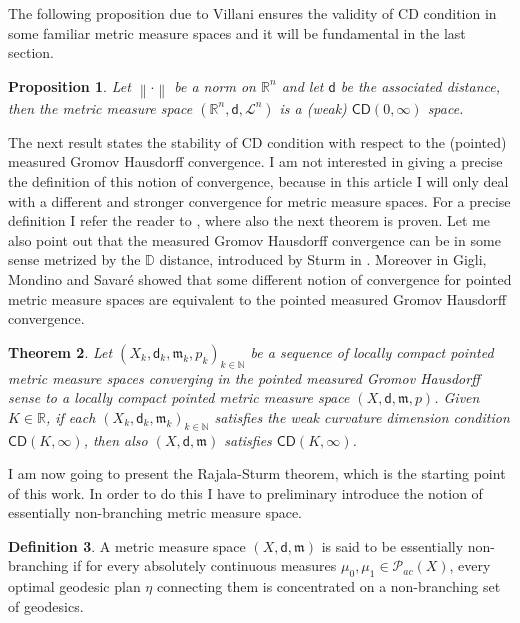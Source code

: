 \documentclass[11pt,twoside,a4paper]{article}
\newcommand{\norm}[1]{\left\lVert#1\right\rVert}
\newcommand{\Leb}{\mathscr{L}}
\newcommand{\setN}{\mathbb{N}}
\newcommand{\R}{\mathbb{R}}
\newcommand{\CD}{\mathsf{CD}}
\newcommand{\di}{\mathsf d} %
\newcommand{\m}{\mathfrak m} %
\newcommand{\Prob}{\mathscr{P}}
\theoremstyle{theorem}
\newtheorem{theorem}{Theorem}[section]
\newtheorem{prop}[theorem]{Proposition}
\theoremstyle{definition}
\newtheorem{definition}[theorem]{Definition}
\theoremstyle{remark}
\theoremstyle{proof}
\begin{document}
\noindent The following proposition due to Villani \cite{villani2008} ensures the validity of CD condition in some familiar metric measure spaces and it will be fundamental in the last section.

\begin{prop}\label{prop:CDinR^n}
Let $\norm{\cdot}$ be a norm on $\R^n$ and let $\di$ be the associated distance, then the metric measure space $(\R^n, \di, \Leb^n)$ is a (weak) $\CD(0,\infty)$ space.
\end{prop}

The next result states the stability of CD condition with respect to the (pointed) measured Gromov Hausdorff convergence. I am not interested in giving a precise the definition of this notion of convergence, because in this article I will only deal with a different and stronger convergence for metric measure spaces. For a precise definition I refer the reader to \cite{villani2008}, where also the next theorem is proven. Let me also point out that the measured Gromov Hausdorff convergence can be in some sense metrized by the $\mathbb{D}$ distance, introduced by Sturm in \cite{sturm2006ii}. Moreover in \cite{Gigli_2015} Gigli, Mondino and Savaré showed that some different notion of convergence for pointed metric measure spaces are equivalent to the pointed measured Gromov Hausdorff convergence.


\begin{theorem}\label{thm:stabilitynoncompact}
Let $(X_k,\di_k,\m_k,p_k)_{k\in\setN}$ be a sequence of locally compact pointed metric measure spaces converging in the pointed measured Gromov Hausdorff sense to a locally compact pointed metric measure space $(X,\di,\m,p)$. Given $K\in\R$, if each $(X_k,\di_k,\m_k)_{k\in\setN}$ satisfies the weak curvature dimension condition $\CD(K,\infty)$, then also $(X,\di,\m)$ satisfies $\CD(K,\infty)$.
\end{theorem}

I am now going to present the Rajala-Sturm theorem, which is the starting point of this work. In order to do this I have to preliminary introduce the notion of essentially non-branching metric measure space.

\begin{definition}
 A metric measure space $(X,\mathsf{d},\mathfrak{m})$ is said to be essentially non-branching if for every absolutely continuous measures $\mu_0,\mu_1\in\Prob_{ac}(X)$, every optimal geodesic plan $\eta$ connecting them is concentrated on a non-branching set of geodesics.
\end{definition}
\end{document}
